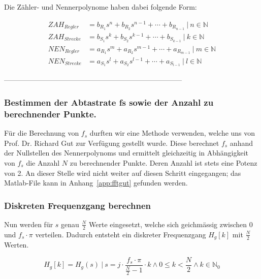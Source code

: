 Die Z\"ahler- und Nennerpolynome haben dabei folgende Form:

\begin{align*}
    ZAH_{Regler}  & = b_{R_1} s^n  + b_{R_2} s^{n-1}  + \dotsb  + b_{R_{n-1}}     ~\biggr \rvert~ n \in  \mathbb{N} \\
    ZAH_{Strecke} & = b_{S_1} s^k  + b_{S_2} s^{k-1}  + \dotsb  + b_{S_{k-1}}     ~\biggr \rvert~ k \in  \mathbb{N}  \\
    NEN_{Regler}  & = a_{R_1} s^m  + a_{R_2} s^{m-1}  + \dotsb  + a_{R_{m-1}}     ~\biggr \rvert~ m \in  \mathbb{N}  \\
    NEN_{Strecke} & = a_{S_1} s^l  + a_{S_2} s^{l-1}  + \dotsb  + a_{S_{l-1}}     ~\biggr \rvert~ l \in  \mathbb{N}
\end{align*}


 --------------------------------------------------------------------------- %
\subsubsection*{Bestimmen der Abtastrate fs sowie der Anzahl zu berechnender Punkte.}

F\"ur die Berechnung von $f_s$ durften  wir eine Methode verwenden, welche uns
von  Prof. Dr. Richard Gut  zur  Verf\"ugung  gestellt wurde. Diese  berechnet
$f_s$ anhand der Nullstellen des  Nennerpolynoms und ermittelt gleichzeitig in
Abh\"angigkeit von $f_s$  die Anzahl $N$ zu  berechnender Punkte. Deren Anzahl
ist stets  eine Potenz von  2. An dieser Stelle  wird nicht weiter  auf diesen
Schritt eingegangen; das Matlab-File  kann in Anhang~\ref{app:fftgut} gefunden
werden.


\subsubsection*{Diskreten Frequenzgang berechnen}

Nun  werden  f\"ur  $s$  genau $\frac{N}{2}$  Werte  eingesetzt,  welche  sich
geichm\"assig zwischen 0  und $f_s \cdot \pi$  verteilen. Dadurch entsteht ein
diskreter Frequenzgang $H_g[k]$ mit $\frac{N}{2}$ Werten.

\begin{equation}
    H_g[k] = H_g(s) ~\biggr \rvert~ s=j \cdot \frac{f_s \cdot \pi}{\frac{N}{2} - 1} \cdot k \land 0 \leq k < \frac{N}{2} \land k \in \mathbb{N}_0
\end{equation}


